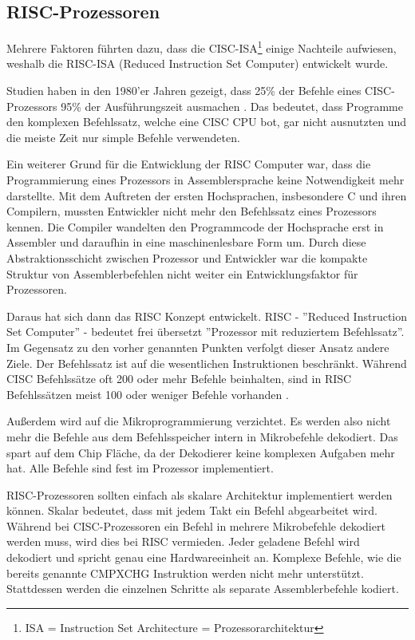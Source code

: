 \documentclass[a4paper,12pt]{article}
\begin{document}
\subsection{RISC-Prozessoren}
Mehrere Faktoren führten dazu, dass die CISC-ISA\footnote{ISA = Instruction Set Architecture = Prozessorarchitektur} einige Nachteile aufwiesen, weshalb die RISC-ISA (Reduced Instruction Set Computer) entwickelt wurde.

\par \bigskip
\noindent Studien haben in den 1980'er Jahren gezeigt, dass 25\% der Befehle eines CISC-Prozessors 95\% der Ausführungszeit ausmachen \cite{jamil1995risc}. Das bedeutet, dass Programme den komplexen Befehlssatz, welche eine CISC CPU bot, gar nicht ausnutzten und die meiste Zeit nur simple Befehle verwendeten. \cite{patterson1985reduced} 

\par \bigskip
\noindent Ein weiterer Grund für die Entwicklung der RISC Computer war, dass die Programmierung eines Prozessors in Assemblersprache keine Notwendigkeit mehr darstellte. Mit dem Auftreten der ersten Hochsprachen, insbesondere C und ihren Compilern, mussten Entwickler nicht mehr den Befehlssatz eines Prozessors kennen. Die Compiler wandelten den Programmcode der Hochsprache erst in Assembler und daraufhin in eine maschinenlesbare Form um. Durch diese Abstraktionsschicht zwischen Prozessor und Entwickler war die kompakte Struktur von Assemblerbefehlen nicht weiter ein Entwicklungsfaktor für Prozessoren.

\par \bigskip
\noindent Daraus hat sich dann das RISC Konzept entwickelt. RISC - ''Reduced Instruction Set Computer'' - bedeutet frei übersetzt ''Prozessor mit reduziertem Befehlssatz''. Im Gegensatz zu den vorher genannten Punkten verfolgt dieser Ansatz andere Ziele. Der Befehlssatz ist auf die wesentlichen Instruktionen beschränkt. Während CISC Befehlssätze oft 200 oder mehr Befehle beinhalten, sind in RISC Befehlssätzen meist 100 oder weniger Befehle vorhanden \cite[S. 85]{TaschenbuchMikroprozessortechnik}.
\par \bigskip
\noindent Außerdem wird auf die Mikroprogrammierung verzichtet. Es werden also nicht mehr die Befehle aus dem Befehlsspeicher intern in Mikrobefehle dekodiert. Das spart auf dem Chip Fläche, da der Dekodierer keine komplexen Aufgaben mehr hat. Alle Befehle sind fest im Prozessor implementiert.
\par \bigskip
\noindent RISC-Prozessoren sollten einfach als skalare Architektur implementiert werden können. Skalar bedeutet, dass mit jedem Takt ein Befehl abgearbeitet wird. Während bei CISC-Prozessoren ein Befehl in mehrere Mikrobefehle dekodiert werden muss, wird dies bei RISC vermieden. Jeder geladene Befehl wird dekodiert und spricht genau eine Hardwareeinheit an. Komplexe Befehle, wie die bereits genannte CMPXCHG Instruktion werden nicht mehr unterstützt. Stattdessen werden die einzelnen Schritte als separate Assemblerbefehle kodiert. 
\end{document}
